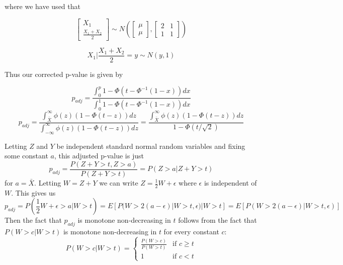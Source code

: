 \documentclass{article}
\begin{document}
\begin{appendix}
where we have used that 

\begin{equation*}
    \begin{bmatrix}
    X_1 \\ \frac{X_1 + X_2}{2}
    \end{bmatrix} \sim N \left(\begin{bmatrix}
        \mu \\ \mu
        \end{bmatrix}, \begin{bmatrix}
            2  & 1 \\ 1 & 1
            \end{bmatrix} \right)
\end{equation*}

\begin{equation*}
    X_1 | \frac{X_1 + X_2}{2} = y \sim N(y, 1)
\end{equation*}


Thus our corrected p-value is given by 

\begin{equation*}
    p_{adj} = \frac{\int_0^p  1 - \Phi(t - \Phi^{-1}(1-x) )   dx }{\int_0^1 1 - \Phi(t - \Phi^{-1}(1-x) ) dx}
\end{equation*}
\begin{equation*}
    p_{adj} = \frac{\int_{\bar{X}}^{\infty} \phi(z) (1 - \Phi(t - z))   dz }{\int_{-\infty}^{\infty} \phi(z) (1 - \Phi(t - z))  dz } = \frac{\int_{\bar{X}}^{\infty} \phi(z) (1 - \Phi(t - z))   dz }{1 - \Phi(t/\sqrt{2})   }
\end{equation*}

Letting $Z$ and $Y$ be independent standard normal random variables and fixing some constant $a$, this adjusted p-value is just 
\begin{equation*}
   p_{adj} = \frac{P(Z + Y > t, Z > a)}{P(Z + Y > t)} = P(Z > a | Z + Y > t)
\end{equation*}
for $a = \bar{X}$. Letting $W = Z + Y$ we can write $Z = \frac{1}{2}W +\epsilon$ where $\epsilon$ is independent of $W$. This gives us 
\begin{equation*}
    p_{adj} = P(\frac{1}{2} W + \epsilon > a | W > t) = E[P(W > 2(a - \epsilon)| W > t, \epsilon)| W > t ] = E[P(W > 2(a - \epsilon)| W > t, \epsilon)]
\end{equation*}
Then the fact that $p_{adj}$ is monotone non-decreasing in $t$ follows from the fact that $P(W > c | W > t)$ is monotone non-decreasing in $t$ for every constant $c$:
\begin{equation*}
{P(W > c |W >t)} = \begin{cases} 
\frac{P(W > c)}{P(W > t)} & \text{if } c \geq t \\
1 & \text{if } c < t 
\end{cases}
\end{equation*}




\end{appendix}
\end{document}
